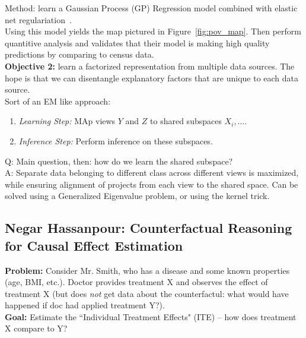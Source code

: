 
Method: learn a Gaussian Process (GP) Regression model combined with elastic net regulariation~\cite{zou2005regularization}. \\

Using this model yields the map pictured in Figure~\ref{fig:pov_map}. Then perform quantitive analysis and validates that their model is making high quality predictions by comparing to census data. \\

{\bf Objective 2:} learn a factorized representation from multiple data sources. The hope is that we can disentangle explanatory factors that are unique to each data source. \\

Sort of an EM like approach:
\begin{enumerate}
    \item {\it Learning Step:} MAp views $Y$ and $Z$ to shared subspaces $X_i, \ldots$.
    \item {\it Inference Step:} Perform inference on these subspaces.
\end{enumerate}

Q: Main question, then: how do we learn the shared subspace?\\

A: Separate data belonging to different class across different views is maximized, while ensuring alignment of projects from each view to the shared space. Can be solved using a Generalized Eigenvalue problem, or using the kernel trick.



\spacerule
\subsection{Negar Hassanpour: Counterfactual Reasoning for Causal Effect Estimation}

{\bf Problem:} Consider Mr. Smith, who has a disease and some known properties (age, BMI, etc.). Doctor provides treatment X and observes the effect of treatment X (but does {\it not} get data about the counterfactul: what would have happened if doc had applied treatment Y?). \\

{\bf Goal:} Estimate the ``Individual Treatment Effects" (ITE) -- how does treatment X compare to Y? \\

